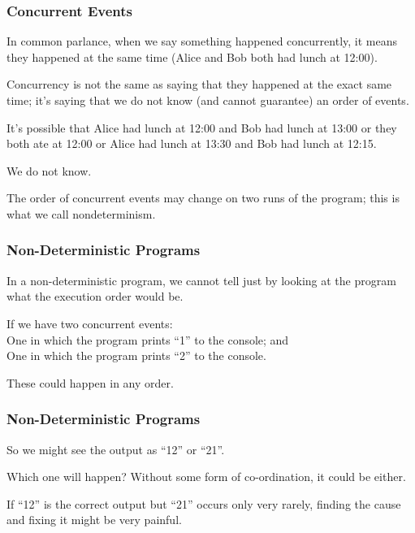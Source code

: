 \begin{frame}
	\frametitle{Concurrent Events}

	In common parlance, when we say something happened concurrently, it means they happened at the same time (Alice and Bob both had lunch at 12:00).

	Concurrency is not the same as saying that they happened at the exact same time; it's saying that we do not know (and cannot guarantee) an order of events.

	It's possible that Alice had lunch at 12:00 and Bob had lunch at 13:00 or they both ate at 12:00 or Alice had lunch at 13:30 and Bob had lunch at 12:15.

	We do not know.

	The order of concurrent events may change on two runs of the program; this is what we call \alert{nondeterminism}.

\end{frame}

\begin{frame}
	\frametitle{Non-Deterministic Programs}

	In a non-deterministic program, we cannot tell just by looking at the program what the execution order would be.

	If we have two concurrent events: \\
	\quad One in which the program prints ``1'' to the console; and\\
	\quad One in which the program prints ``2'' to the console.

	These could happen in any order.

\end{frame}

\begin{frame}
	\frametitle{Non-Deterministic Programs}

	So we might see the output as ``12'' or ``21''.

	Which one will happen? Without some form of co-ordination, it could be either.

	If ``12'' is the correct output but ``21'' occurs only very rarely, finding the cause and fixing it might be very painful.


\end{frame}


